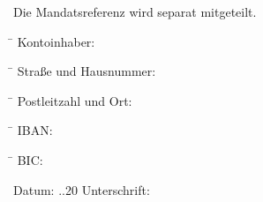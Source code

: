 \documentclass{scrartcl}
\begin{document}
\addvspace{0.2cm}
Die Mandatsreferenz wird separat mitgeteilt.
\begin{tabbing}
\hspace*{5cm}\= \hspace*{7cm} \kill
Kontoinhaber: \> \underline{\hspace{335pt}}
\end{tabbing}
\begin{tabbing}
\hspace*{5cm}\= \hspace*{7cm} \kill
Stra{\ss}e und Hausnummer: \> \underline{\hspace{335pt}}
\end{tabbing}
\begin{tabbing}
\hspace*{5cm}\= \hspace*{7cm} \kill
Postleitzahl und Ort: \> \underline{\hspace{335pt}}
\end{tabbing}
\begin{tabbing}
\hspace*{5cm}\= \hspace*{7cm} \kill
IBAN:\enskip\hrulefill \> \underline{\hspace{335pt}}
\end{tabbing}
\begin{tabbing}
\hspace*{5cm}\= \hspace*{7cm} \kill
BIC:\enskip\hrulefill \> \underline{\hspace{335pt}}
\end{tabbing}

\addvspace{0.4cm}

Datum: \hspace{2pt} \underline{\hspace{20pt}}.\underline{\hspace{20pt}}.20\underline{\hspace{20pt}} Unterschrift: \hspace{2pt} \underline{\hspace{10cm}} 

\addvspace{0.2cm}
\hfill {}
\end{document}
